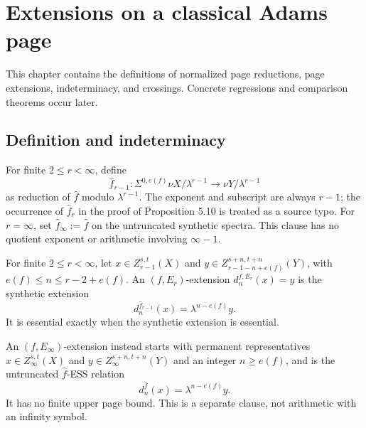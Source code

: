 \chapter{Extensions on a classical Adams page}
\label{chap:page-extensions}

This chapter contains the definitions of normalized page reductions, page extensions, indeterminacy, and crossings.  Concrete regressions and comparison theorems occur later.

\section{Definition and indeterminacy}

\begin{definition}
  \label{def:hat-map-page-reduction}
  \notready
  For finite $2\le r<\infty$, define
  \[
    \widehat f_{r-1}:\Sigma^{0,e(f)}\nu X/\lambda^{r-1}
       \longrightarrow\nu Y/\lambda^{r-1}
  \]
  as reduction of $\widehat f$ modulo $\lambda^{r-1}$.  The exponent and
  subscript are always $r-1$; the occurrence of $\widehat f_r$ in the proof of
  Proposition 5.10 is treated as a source typo.
  For $r=\infty$, set $\widehat f_\infty:=\widehat f$ on the untruncated
  synthetic spectra.  This clause has no quotient exponent or arithmetic
  involving $\infty-1$.
\end{definition}

\begin{definition}[$(f,E_r)$-extension]
  \label{def:page-extension}
  \notready
  For finite $2\le r<\infty$, let $x\in Z_{r-1}^{s,t}(X)$ and
  $y\in Z_{r-1-n+e(f)}^{s+n,t+n}(Y)$, with
  $e(f)\le n\le r-2+e(f)$.  An $(f,E_r)$-extension
  $d_n^{f,E_r}(x)=y$ is the synthetic extension
  \[
    d_n^{\widehat f_{r-1}}(x)=\lambda^{n-e(f)}y.
  \]
  It is essential exactly when the synthetic extension is essential.

  An $(f,E_\infty)$-extension instead starts with permanent representatives
  $x\in Z_\infty^{s,t}(X)$ and
  $y\in Z_\infty^{s+n,t+n}(Y)$ and an integer $n\ge e(f)$, and is the
  untruncated $\widehat f$-ESS relation
  \[
    d_n^{\widehat f}(x)=\lambda^{n-e(f)}y.
  \]
  It has no finite upper page bound.  This is a separate clause, not arithmetic
  with an infinity symbol.
\end{definition}

